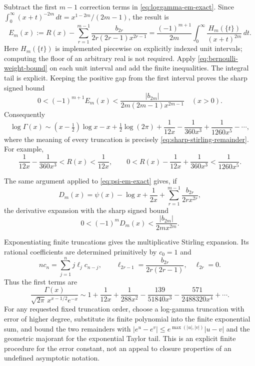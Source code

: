 Subtract the first $m-1$ correction terms in
\eqref{eq:loggamma-em-exact}.  Since
$\int_0^\infty(x+t)^{-2m}\,dt=x^{1-2m}/(2m-1)$, the result is
\begin{equation}\label{eq:stirling-remainder-positive-integral}
 E_m(x):=R(x)-\sum_{r=1}^{m-1}
            \frac{b_{2r}}{2r(2r-1)x^{2r-1}}
 =\frac{(-1)^{m+1}}{2m}
       \int_0^\infty\frac{H_m(\{t\})}{(x+t)^{2m}}\,dt.
\end{equation}
Here $H_m(\{t\})$ is implemented piecewise on explicitly indexed unit
intervals; computing the floor of an arbitrary real is not required.
Apply \eqref{eq:bernoulli-weight-bound} on each unit interval and add the
finite inequalities.  The integral tail is explicit.  Keeping the
positive gap from the first interval proves the sharp signed bound
\begin{equation}\label{eq:sharp-stirling-remainder}
 \boxed{\quad
 0<(-1)^{m+1}E_m(x)
 <\frac{|b_{2m}|}{2m(2m-1)x^{2m-1}}
 \quad(x>0).\quad}
\end{equation}
Consequently
\[
 \log\Gamma(x)\sim
 (x-\tfrac12)\log x-x+\tfrac12\log(2\pi)
 +\frac1{12x}-\frac1{360x^3}+\frac1{1260x^5}-\cdots,
\]
where the meaning of every truncation is precisely
\eqref{eq:sharp-stirling-remainder}.  For example,
\[
 \frac1{12x}-\frac1{360x^3}<R(x)<\frac1{12x},\qquad
 0<R(x)-\frac1{12x}+\frac1{360x^3}<\frac1{1260x^5}.
\]

The same argument applied to \eqref{eq:psi-em-exact} gives, if
\[
 D_m(x)=\psi(x)-\log x+\frac1{2x}
             +\sum_{r=1}^{m-1}\frac{b_{2r}}{2r x^{2r}},
\]
the derivative expansion with the sharp signed bound
\begin{equation}\label{eq:sharp-digamma-remainder}
 0<(-1)^mD_m(x)<\frac{|b_{2m}|}{2m x^{2m}}.
\end{equation}

Exponentiating finite truncations gives the multiplicative Stirling
expansion.  Its rational coefficients are determined primitively by
$c_0=1$ and
\[
 n c_n=\sum_{j=1}^{n}j\ell_jc_{n-j},\qquad
 \ell_{2r-1}=\frac{b_{2r}}{2r(2r-1)},\quad \ell_{2r}=0.
\]
Thus the first terms are
\[
 \frac{\Gamma(x)}{\sqrt{2\pi}\,x^{x-1/2}e^{-x}}
 \sim1+\frac1{12x}+\frac1{288x^2}
          -\frac{139}{51840x^3}-\frac{571}{2488320x^4}+\cdots.
\]
For any requested fixed truncation order, choose a log-gamma truncation
with error of higher degree, substitute its finite polynomial into the
finite exponential sum, and bound the two remainders with
$|e^u-e^v|\le e^{\max(|u|,|v|)}|u-v|$ and the geometric majorant for the
exponential Taylor tail.  This is an explicit finite procedure for the
error constant, not an appeal to closure properties of an undefined
asymptotic notation.

